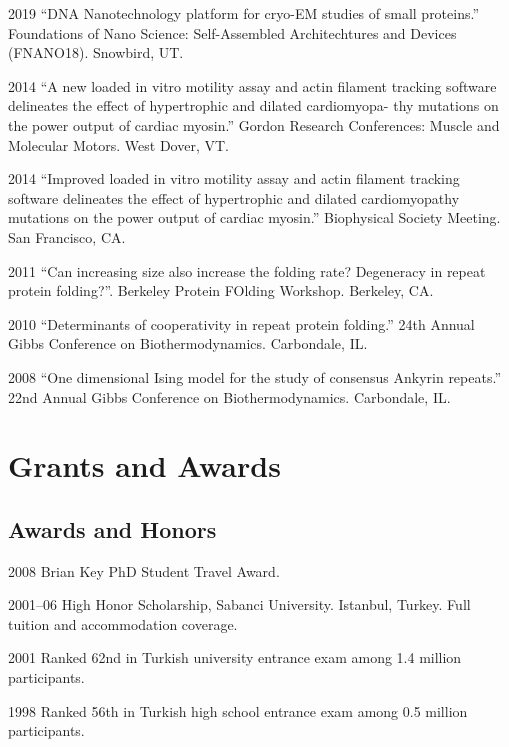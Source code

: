 \documentclass[12pt,letterpaper]{report}
\begin{document}
    \begin{tablist}

        \item[2019] \tab{}\enquote{DNA Nanotechnology platform for cryo-EM studies of small proteins.} Foundations of Nano Science: Self-Assembled Architechtures and Devices (FNANO18). Snowbird, UT.

        \item[2014] \tab{}\enquote{A new loaded in vitro motility assay and actin filament tracking software delineates the effect of hypertrophic and dilated cardiomyopa- thy mutations on the power output of cardiac myosin.} Gordon Research Conferences: Muscle and Molecular Motors. West Dover, VT.

        \item[2014] \tab{}\enquote{Improved loaded in vitro motility assay and actin filament tracking software delineates the effect of hypertrophic and dilated cardiomyopathy mutations on the power output of cardiac myosin.} Biophysical Society Meeting. San Francisco, CA.

        \item[2011] \tab{}\enquote{Can increasing size also increase the folding rate? Degeneracy in repeat protein folding?}. Berkeley Protein FOlding Workshop. Berkeley, CA.

        \item[2010] \tab{}\enquote{Determinants of cooperativity in repeat protein folding.} 24th Annual Gibbs Conference on Biothermodynamics. Carbondale, IL.

        \item[2008] \tab{}\enquote{One dimensional Ising model for the study of consensus Ankyrin repeats.} 22nd Annual Gibbs Conference on Biothermodynamics. Carbondale, IL.

    \end{tablist}


    \section*{Grants and Awards}

    \subsection*{Awards and Honors}

    \begin{tablist}

        \item[2008] \tab{}Brian Key PhD Student Travel Award.
        \item[2001--06] \tab{}High Honor Scholarship, Sabanci University. Istanbul, Turkey. Full tuition and accommodation coverage.
        \item[2001] \tab{}Ranked 62nd in Turkish university entrance exam among 1.4 million participants.
        \item[1998] \tab{}Ranked 56th in Turkish high school entrance exam among 0.5 million participants.

    \end{tablist}
\end{document}
